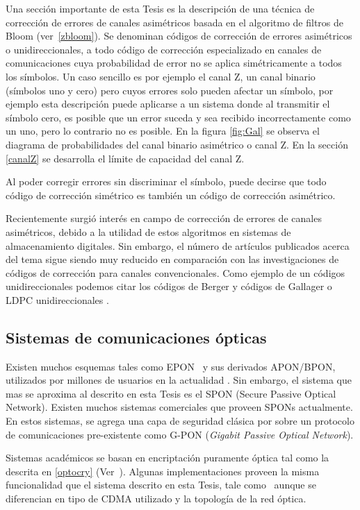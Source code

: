 Una sección importante de esta Tesis es la descripción de una técnica de corrección de errores de canales asimétricos basada en el algoritmo de filtros de Bloom (ver~\ref{zbloom}). 
Se denominan códigos de corrección de errores asimétricos o unidireccionales, a todo código de corrección especializado en canales de comunicaciones cuya probabilidad de error no se aplica simétricamente a todos los símbolos. Un caso sencillo es por ejemplo el canal Z, un canal binario (símbolos uno y cero) pero cuyos errores solo pueden afectar un símbolo, por ejemplo esta descripción puede aplicarse a un sistema donde al transmitir el símbolo cero, es posible que un error suceda y sea recibido incorrectamente como un uno, pero lo contrario no es posible. En la figura \ref{fig:Gal} se observa el diagrama de probabilidades del canal binario asimétrico o canal Z. En la sección \ref{canalZ} se desarrolla el límite de capacidad del canal Z.

 Al poder corregir errores sin discriminar el símbolo, puede decirse que todo código de corrección simétrico es también un código de corrección asimétrico.

Recientemente surgió interés en campo de corrección de errores de canales asimétricos, debido a la utilidad de estos algoritmos en sistemas de almacenamiento digitales\cite{tanakamaru201195}. Sin embargo, el número de artículos publicados acerca del tema sigue siendo muy reducido en comparación con las investigaciones de códigos de corrección para canales convencionales. Como ejemplo de un códigos unidireccionales podemos citar los códigos de Berger \cite{berger1961note} y códigos de Gallager o LDPC unidireccionales \cite{neri2008gallager}.

\subsection{Sistemas de comunicaciones ópticas}

Existen muchos esquemas tales como EPON~\cite{kramer2002ethernet} y sus derivados APON/BPON, utilizados por millones de usuarios en la actualidad \cite{chanclou2013france}.
Sin embargo, el sistema que mas se aproxima al descrito en esta Tesis es el SPON (Secure Passive Optical Network). Existen muchos sistemas comerciales que proveen SPONs actualmente. En estos sistemas, se agrega una capa de seguridad clásica por sobre un protocolo de comunicaciones  pre-existente como G-PON (\textit{Gigabit Passive Optical Network}).

Sistemas académicos se basan en encriptación puramente óptica tal como la descrita en \ref{optocry} (Ver~\cite{cincotti2009secure}). Algunas implementaciones proveen la misma funcionalidad que el sistema descrito en esta Tesis, tale como~\cite{nadarajah2006implementation} aunque se diferencian en tipo de CDMA utilizado y la topología de la red óptica.

